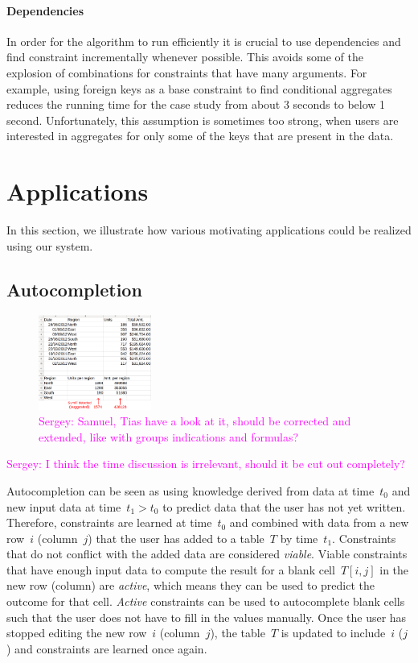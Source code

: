 \documentclass{IEEEtran}
\newcommand{\sergey}[1]{\textcolor{magenta}{{\sc Sergey:} #1}\xspace}
\theoremstyle{definition}
\begin{document}
\paragraph{Dependencies}
In order for the algorithm to run efficiently it is crucial to use dependencies and find constraint incrementally whenever possible.
This avoids some of the explosion of combinations for constraints that have many arguments.
For example, using foreign keys as a base constraint to find conditional aggregates reduces the running time for the case study from about 3 seconds to below 1 second.
Unfortunately, this assumption is sometimes too strong, when users are interested in aggregates for only some of the keys that are present in the data.

\section{Applications}\label{sec:applications}
In this section, we illustrate how various motivating applications could be realized using our system.

\subsection{Autocompletion}
\begin{figure}[thb]
  \begin{center}
    \includegraphics[width=0.33\textwidth]{figures/autocompletion_example.png}
  \end{center}
  \caption{\sergey{Samuel, Tias have a look at it, should be corrected and extended, like with groups indications and formulas?}}
  \label{fig:autocompletion_example}
\end{figure}
\sergey{I think the time discussion is irrelevant, should it be cut out completely?}

Autocompletion can be seen as using knowledge derived from data at time~$t_0$ and new input data at time~$t_1 > t_0$ to predict data that the user has not yet written.
Therefore, constraints are learned at time~$t_0$ and combined with data from a new row~$i$ (column~$j$) that the user has added to a table~$T$ by time~$t_1$.
Constraints that do not conflict with the added data are considered \textit{viable}.
Viable constraints that have enough input data to compute the result for a blank cell~$T[i,j]$ in the new row (column) are \textit{active}, which means they can be used to predict the outcome for that cell.
\textit{Active} constraints can be used to autocomplete blank cells such that the user does not have to fill in the values manually.
Once the user has stopped editing the new row~$i$ (column~$j$), the table~$T$ is updated to include~$i$ ($j$) and constraints are learned once again.
\end{document}
